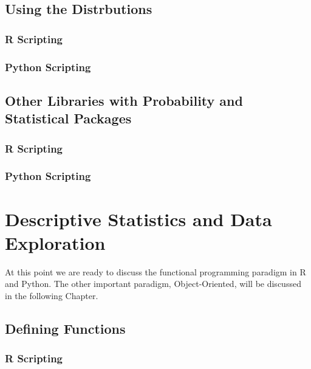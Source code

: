 \documentclass[]{book}
\theoremstyle{definition}
\theoremstyle{definition}
\theoremstyle{definition}
\theoremstyle{remark}
\begin{document}
\section{Using the Distrbutions}\label{using-the-distrbutions}

\subsection{R Scripting}\label{r-scripting-7}

\subsection{Python Scripting}\label{python-scripting-7}

\section{Other Libraries with Probability and Statistical
Packages}\label{other-libraries-with-probability-and-statistical-packages}

\subsection{R Scripting}\label{r-scripting-8}

\subsection{Python Scripting}\label{python-scripting-8}

\chapter{Descriptive Statistics and Data
Exploration}\label{descriptive-statistics-and-data-exploration}

At this point we are ready to discuss the functional programming
paradigm in R and Python. The other important paradigm, Object-Oriented,
will be discussed in the following Chapter.

\section{Defining Functions}\label{defining-functions-1}

\subsection{R Scripting}\label{r-scripting-9}
\end{document}

